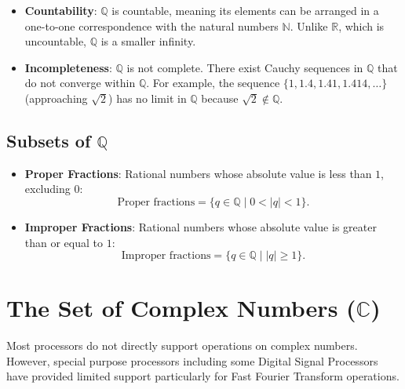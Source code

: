 \begin{itemize}
    \item \textbf{Countability}: \( \mathbb{Q} \) is countable, meaning its elements can be arranged in a one-to-one correspondence with the natural numbers \( \mathbb{N} \). Unlike \( \mathbb{R} \), which is uncountable, \( \mathbb{Q} \) is a smaller infinity.

\vspace{\baselineskip}\par
    \item \textbf{Incompleteness}: \( \mathbb{Q} \) is not complete. There exist Cauchy sequences in \( \mathbb{Q} \) that do not converge within \( \mathbb{Q} \). For example, the sequence \( \{1, 1.4, 1.41, 1.414, \dots\} \) (approaching \( \sqrt{2} \)) has no limit in \( \mathbb{Q} \) because \( \sqrt{2} \notin \mathbb{Q} \).
\end{itemize}


\subsection{Subsets of $\mathbb{Q}$}
\begin{itemize}
    \item \textbf{Proper Fractions}:
    Rational numbers whose absolute value is less than \( 1 \), excluding \( 0 \):
    \[
    \text{Proper fractions} = \{q \in \mathbb{Q} \mid 0 < |q| < 1\}.
    \]

    \item \textbf{Improper Fractions}:
    Rational numbers whose absolute value is greater than or equal to \( 1 \):
    \[
    \text{Improper fractions} = \{q \in \mathbb{Q} \mid |q| \geq 1\}.
    \]
\end{itemize}



\section{The Set of Complex Numbers (\( \mathbb{C} \))}
Most processors do not directly support operations on complex numbers. However, special purpose processors including some Digital Signal Processors have provided limited support particularly for Fast Fourier Transform operations. 

